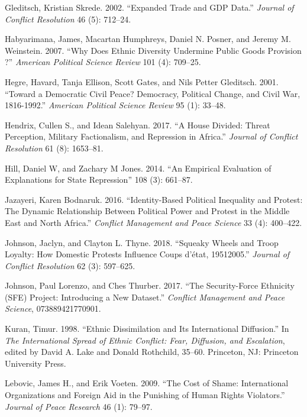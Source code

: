 \documentclass[12pt,]{article}
\theoremstyle{definition}
\theoremstyle{definition}
\theoremstyle{definition}
\theoremstyle{remark}
\begin{document}
\leavevmode\hypertarget{ref-Gleditsch2002a}{}%
Gleditsch, Kristian Skrede. 2002. ``Expanded Trade and GDP Data.''
\emph{Journal of Conflict Resolution} 46 (5): 712--24.

\leavevmode\hypertarget{ref-Habyarimana2007}{}%
Habyarimana, James, Macartan Humphreys, Daniel N. Posner, and Jeremy M.
Weinstein. 2007. ``Why Does Ethnic Diversity Undermine Public Goods
Provision ?'' \emph{American Political Science Review} 101 (4): 709--25.

\leavevmode\hypertarget{ref-Hegre2001}{}%
Hegre, Havard, Tanja Ellison, Scott Gates, and Nils Petter Gleditsch.
2001. ``Toward a Democratic Civil Peace? Democracy, Political Change,
and Civil War, 1816-1992.'' \emph{American Political Science Review} 95
(1): 33--48.

\leavevmode\hypertarget{ref-Hendrix2017}{}%
Hendrix, Cullen S., and Idean Salehyan. 2017. ``A House Divided: Threat
Perception, Military Factionalism, and Repression in Africa.''
\emph{Journal of Conflict Resolution} 61 (8): 1653--81.

\leavevmode\hypertarget{ref-Hill2014}{}%
Hill, Daniel W, and Zachary M Jones. 2014. ``An Empirical Evaluation of
Explanations for State Repression'' 108 (3): 661--87.

\leavevmode\hypertarget{ref-Jazayeri2016}{}%
Jazayeri, Karen Bodnaruk. 2016. ``Identity-Based Political Inequality
and Protest: The Dynamic Relationship Between Political Power and
Protest in the Middle East and North Africa.'' \emph{Conflict Management
and Peace Science} 33 (4): 400--422.

\leavevmode\hypertarget{ref-Johnson2018}{}%
Johnson, Jaclyn, and Clayton L. Thyne. 2018. ``Squeaky Wheels and Troop
Loyalty: How Domestic Protests Influence Coups d'état, 19512005.''
\emph{Journal of Conflict Resolution} 62 (3): 597--625.

\leavevmode\hypertarget{ref-Johnson2017}{}%
Johnson, Paul Lorenzo, and Ches Thurber. 2017. ``The Security-Force
Ethnicity (SFE) Project: Introducing a New Dataset.'' \emph{Conflict
Management and Peace Science}, 073889421770901.

\leavevmode\hypertarget{ref-Kuran1998}{}%
Kuran, Timur. 1998. ``Ethnic Dissimilation and Its International
Diffusion.'' In \emph{The International Spread of Ethnic Conflict: Fear,
Diffusion, and Escalation}, edited by David A. Lake and Donald
Rothchild, 35--60. Princeton, NJ: Princeton University Press.

\leavevmode\hypertarget{ref-Lebovic2009}{}%
Lebovic, James H., and Erik Voeten. 2009. ``The Cost of Shame:
International Organizations and Foreign Aid in the Punishing of Human
Rights Violators.'' \emph{Journal of Peace Research} 46 (1): 79--97.
\end{document}
